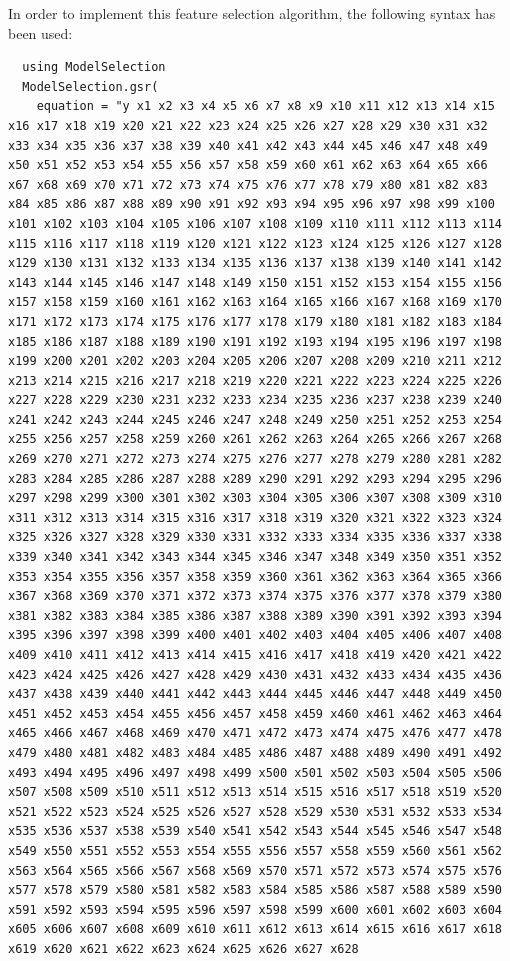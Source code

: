 \documentclass{article}
\begin{document}
In order to implement this feature selection algorithm, the following syntax has been used:

\begin{lstlisting} 
  using ModelSelection
  ModelSelection.gsr(
    equation = "y x1 x2 x3 x4 x5 x6 x7 x8 x9 x10 x11 x12 x13 x14 x15 x16 x17 x18 x19 x20 x21 x22 x23 x24 x25 x26 x27 x28 x29 x30 x31 x32 x33 x34 x35 x36 x37 x38 x39 x40 x41 x42 x43 x44 x45 x46 x47 x48 x49 x50 x51 x52 x53 x54 x55 x56 x57 x58 x59 x60 x61 x62 x63 x64 x65 x66 x67 x68 x69 x70 x71 x72 x73 x74 x75 x76 x77 x78 x79 x80 x81 x82 x83 x84 x85 x86 x87 x88 x89 x90 x91 x92 x93 x94 x95 x96 x97 x98 x99 x100 x101 x102 x103 x104 x105 x106 x107 x108 x109 x110 x111 x112 x113 x114 x115 x116 x117 x118 x119 x120 x121 x122 x123 x124 x125 x126 x127 x128 x129 x130 x131 x132 x133 x134 x135 x136 x137 x138 x139 x140 x141 x142 x143 x144 x145 x146 x147 x148 x149 x150 x151 x152 x153 x154 x155 x156 x157 x158 x159 x160 x161 x162 x163 x164 x165 x166 x167 x168 x169 x170 x171 x172 x173 x174 x175 x176 x177 x178 x179 x180 x181 x182 x183 x184 x185 x186 x187 x188 x189 x190 x191 x192 x193 x194 x195 x196 x197 x198 x199 x200 x201 x202 x203 x204 x205 x206 x207 x208 x209 x210 x211 x212 x213 x214 x215 x216 x217 x218 x219 x220 x221 x222 x223 x224 x225 x226 x227 x228 x229 x230 x231 x232 x233 x234 x235 x236 x237 x238 x239 x240 x241 x242 x243 x244 x245 x246 x247 x248 x249 x250 x251 x252 x253 x254 x255 x256 x257 x258 x259 x260 x261 x262 x263 x264 x265 x266 x267 x268 x269 x270 x271 x272 x273 x274 x275 x276 x277 x278 x279 x280 x281 x282 x283 x284 x285 x286 x287 x288 x289 x290 x291 x292 x293 x294 x295 x296 x297 x298 x299 x300 x301 x302 x303 x304 x305 x306 x307 x308 x309 x310 x311 x312 x313 x314 x315 x316 x317 x318 x319 x320 x321 x322 x323 x324 x325 x326 x327 x328 x329 x330 x331 x332 x333 x334 x335 x336 x337 x338 x339 x340 x341 x342 x343 x344 x345 x346 x347 x348 x349 x350 x351 x352 x353 x354 x355 x356 x357 x358 x359 x360 x361 x362 x363 x364 x365 x366 x367 x368 x369 x370 x371 x372 x373 x374 x375 x376 x377 x378 x379 x380 x381 x382 x383 x384 x385 x386 x387 x388 x389 x390 x391 x392 x393 x394 x395 x396 x397 x398 x399 x400 x401 x402 x403 x404 x405 x406 x407 x408 x409 x410 x411 x412 x413 x414 x415 x416 x417 x418 x419 x420 x421 x422 x423 x424 x425 x426 x427 x428 x429 x430 x431 x432 x433 x434 x435 x436 x437 x438 x439 x440 x441 x442 x443 x444 x445 x446 x447 x448 x449 x450 x451 x452 x453 x454 x455 x456 x457 x458 x459 x460 x461 x462 x463 x464 x465 x466 x467 x468 x469 x470 x471 x472 x473 x474 x475 x476 x477 x478 x479 x480 x481 x482 x483 x484 x485 x486 x487 x488 x489 x490 x491 x492 x493 x494 x495 x496 x497 x498 x499 x500 x501 x502 x503 x504 x505 x506 x507 x508 x509 x510 x511 x512 x513 x514 x515 x516 x517 x518 x519 x520 x521 x522 x523 x524 x525 x526 x527 x528 x529 x530 x531 x532 x533 x534 x535 x536 x537 x538 x539 x540 x541 x542 x543 x544 x545 x546 x547 x548 x549 x550 x551 x552 x553 x554 x555 x556 x557 x558 x559 x560 x561 x562 x563 x564 x565 x566 x567 x568 x569 x570 x571 x572 x573 x574 x575 x576 x577 x578 x579 x580 x581 x582 x583 x584 x585 x586 x587 x588 x589 x590 x591 x592 x593 x594 x595 x596 x597 x598 x599 x600 x601 x602 x603 x604 x605 x606 x607 x608 x609 x610 x611 x612 x613 x614 x615 x616 x617 x618 x619 x620 x621 x622 x623 x624 x625 x626 x627 x628 
\end{lstlisting}
\end{document}
